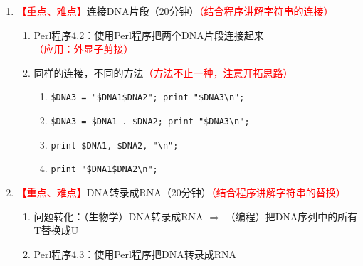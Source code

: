 \documentclass{TIJMUjiaoanLL}
\begin{document}
\begin{enumerate}
\begin{enumerate}
\begin{multicols}{2}
	\begin{itemize}
	  \item 编辑运行：ASCII或纯文本格式；可执行权限
	  \item 控制流：顺序执行；条件/循环流程控制\textcolor{red}{（和RPG中的主线支线相类比）}
	  \item 注释：以 \verb|#|起始，空行和注释会被解释器忽略
	  \item 命令解释：\verb|#!/usr/bin/perl|
	  \item 语句：以 \verb|;|结尾\textcolor{red}{（和中文/英文中的句号相类比）}
	  \item 变量：命名规范；标量变量（以 \verb|$|起始）
	  \item 字符串：单引号 vs. 双引号
	  \item 赋值：\verb|=| vs. \verb|==|
	  \item 打印输出：print，STDOUT
	  \item 退出：\verb|exit;| vs. 自动退出
	\end{itemize}
\end{multicols}
\vspace*{-1em}
    \end{enumerate}
  \item \textcolor{red}{【重点、难点】}连接DNA片段（20分钟）\textcolor{red}{（结合程序讲解字符串的连接）}
    \begin{enumerate}
      \item Perl程序4.2：使用Perl程序把两个DNA片段连接起来\textcolor{red}{（应用：外显子剪接）}
      \item 同样的连接，不同的方法\textcolor{red}{（方法不止一种，注意开拓思路）}
	\begin{enumerate}
	  \item \verb|$DNA3 = "$DNA1$DNA2"; print "$DNA3\n";|
	  \item \verb|$DNA3 = $DNA1 . $DNA2; print "$DNA3\n";|
	  \item \verb|print $DNA1, $DNA2, "\n";|
	  \item \verb|print "$DNA1$DNA2\n";|
	\end{enumerate}
    \end{enumerate}
  \item \textcolor{red}{【重点、难点】}DNA转录成RNA（20分钟）\textcolor{red}{（结合程序讲解字符串的替换）}
    \begin{enumerate}
      \item 问题转化：（生物学）DNA转录成RNA $\Longrightarrow$ （编程）把DNA序列中的所有T替换成U
      \item Perl程序4.3：使用Perl程序把DNA转录成RNA

\end{enumerate}
\end{enumerate}
\end{document}
